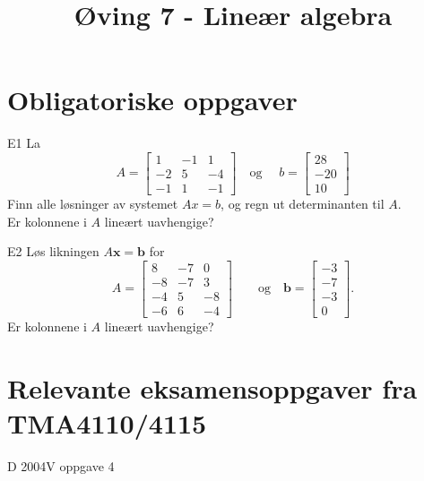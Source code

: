 \documentclass[a4paper,norsk,11pt]{interaktiv}
\title{Øving 7 - Lineær algebra}
\newcommand{\V}[1]{\mathbf{#1}}
\begin{document}

\maketitle


\section*{Obligatoriske oppgaver}



\begin{oppgave}{E1}
La 
\[
A=
\begin{bmatrix}
1 & -1 & 1 \\ -2 & 5 & -4 \\ -1 & 1 & -1
\end{bmatrix}
\quad
\text{og }
\quad
b=
\begin{bmatrix}
28 \\ -20 \\ 10 
\end{bmatrix} 
\]
Finn alle løsninger av systemet $Ax=b$, 
og regn ut determinanten til $A$.\\
Er kolonnene i $A$ lineært uavhengige?
\end{oppgave}



\begin{oppgave}{E2}
Løs likningen $A\V{x}=\V{b}$ for 
$$
A=
	\begin{bmatrix}
	8  & -7 & 0 \\
	-8 & -7 & 3 \\
	-4 & 5  & -8\\
	-6 & 6  & -4
	\end{bmatrix}
\qquad 
\text{og}\quad
        \V{b}=
	\begin{bmatrix}
	-3  \\
	-7 \\
	-3 \\
	0
	\end{bmatrix}.
	$$
	Er kolonnene i $A$ lineært uavhengige?
\end{oppgave}


\section*{Relevante eksamensoppgaver fra TMA4110/4115}

\begin{oppgave}{D}
2004V oppgave 4
\end{oppgave}
\end{document}
